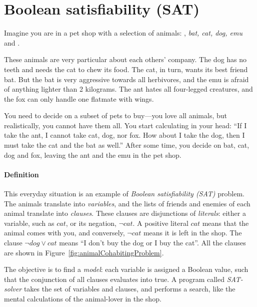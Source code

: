 \def\ant{\text{\em ant}}
\def\bat{\text{\em bat}}
\def\cat{\text{\em cat}}
\def\dog{\text{\em dog}}
\def\emu{\text{\em emu}}
\def\fox{\text{\em fox}}


\section{Boolean satisfiability (SAT)}


Imagine you are in a pet shop with a selection of animals: \ant, {\em bat, cat, dog, emu} and \fox.

These animals are very particular about each others' company. The dog has no teeth and needs the cat to chew its food. The cat, in turn, wants its best friend bat. 
But the bat is very aggressive towards all herbivores, and the emu is afraid of anything lighter than 2 kilograms. The ant hates all four-legged creatures, and the fox can only handle one flatmate with wings. 

You need to decide on a subset of pets to buy---you love all animals, but realistically, you cannot have them all. You start calculating in your head: ``If I take the ant, I cannot take cat, dog, nor fox. How about I take the dog, then I must take the cat and the bat as well.''
After some time, you decide on bat, cat, dog and fox, leaving the ant and the emu in the pet shop.

\paragraph{Definition}

This everyday situation is an example of \emph{Boolean satisfiability (SAT)} problem.
The animals translate into \emph{variables}, %
and the lists of friends and enemies of each animal translate into \emph{clauses}.
These clauses are disjunctions of \emph{literals}: either a variable, such as $cat$, or its negation, $\neg{}cat$.
A positive literal $cat$ means that the animal comes with you, 
and conversely, $\neg{}cat$ means it is left in the shop. 
The clause $\neg{}dog \vee cat$ means ``I don't buy the dog or I buy the cat''. 
All the clauses are shown in Figure~\ref{fig:animalCohabitingProblem}.


The objective is to find a \emph{model}: each variable is assigned a Boolean value, such that the conjunction of all clauses evaluates into true. A program called \emph{SAT-solver} takes the set of variables and clauses, and performs a search, like the mental calculations of the animal-lover in the shop.


